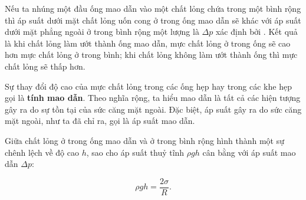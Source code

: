 
Nếu ta nhúng một đầu ống mao dẫn vào một chất lỏng chứa trong một bình rộng thì áp suất dưới mặt chất lỏng uốn cong ở trong ống mao dẫn sẽ khác với áp suất dưới mặt phẳng ngoài ở trong bình rộng một lượng là $\Delta p$ xác định bởi . Kết quả là khi chất lỏng làm ướt thành ống mao dẫn, mực chất lỏng ở trong ống sẽ cao hơn mực chất lỏng ở trong bình; khi chất lỏng không làm ướt thành ống thì mực chất lỏng sẽ thấp hơn.


Sự thay đổi độ cao của mực chất lỏng trong các ống hẹp hay trong các khe hẹp gọi là \textbf{tính mao dẫn}. Theo nghĩa rộng, ta hiểu mao dẫn là tất cả các hiện tượng gây ra do sự tồn tại của sức căng mặt ngoài. Đặc biệt, áp suất  gây ra do sức căng mặt ngoài, như ta đã chỉ ra, gọi là áp suất mao dẫn.


Giữa chất lỏng ở trong ống mao dẫn và ở trong bình rộng hình thành một sự chênh lệch về độ cao $h$, sao cho áp suất thuỷ tĩnh $\rho gh$ cân bằng với áp suất mao dẫn $\Delta p$:

\begin{equation}\label{eq:14_8}
	\rho gh = \frac{2\sigma}{R}.
\end{equation}

\noindent


